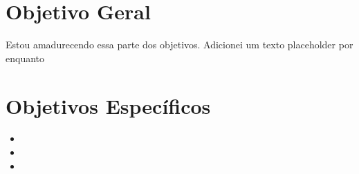 \section{Objetivo Geral}
Estou amadurecendo essa parte dos objetivos. Adicionei um texto placeholder por enquanto
\lipsum[2]
\section{Objetivos Específicos}
\begin{itemize}
    \item \lipsum[1]
    \item \lipsum[1]
    \item \lipsum[1]
  \end{itemize}
